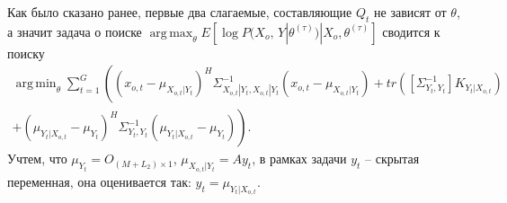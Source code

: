 \documentclass[11pt]{article}
\DeclareMathOperator*{\argmax}{arg\,max}
\DeclareMathOperator*{\argmin}{arg\,min}
\begin{document}
Как было сказано ранее, первые два слагаемые, составляющие $Q_t$ не зависят от $\theta$, а значит задача о поиске $\argmax_{\theta} E[\log P(X_o, \, Y|\theta^{(\tau)})|X_o, \theta^{(\tau)}] $ сводится к поиску
\begin{equation}
\begin{gathered}
\argmin_{\theta}  \sum_{t=1}^G \left((x_{o,t}-\mu_{X_{o,t}|Y_t})^H\Sigma_{X_{o,t}|Y_t,X_{o,t}|Y_t}^{-1}(x_{o,t}-\mu_{X_{o,t}|Y_t}) +  tr([\Sigma_{Y_t,Y_t}^{-1}]K_{Y_t|X_{o,t}}) \right. \\ \left. +  (\mu_{Y_t|X_{o,t}}-\mu_{Y_t})^H\Sigma_{Y_t,Y_t}^{-1}(\mu_{Y_t|X_{o,t}}-\mu_{Y_t})\right).
\end{gathered}
\end{equation}
Учтем, что $\mu_{Y_t} = O_{(M+L_2) \times 1}$, $\mu_{X_{o,t}|Y_t}=Ay_t$, в рамках задачи $y_t$ -- скрытая переменная, она оценивается так: $\hat{y}_t = \mu_{Y_t|X_{o,t}}$.
\end{document}
